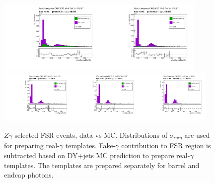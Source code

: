 \begin{figure}[htb]
  \begin{center}
   \includegraphics[width=0.45\textwidth]{../figs/figs_v11/MUON_ZGamma/PrepareYields/c_TotalDATAvsMC_EtaCommon__phoSigmaIEtaIEtaFSR_pt10to15_.pdf}\includegraphics[width=0.45\textwidth]{../figs/figs_v11/MUON_ZGamma/PrepareYields/c_TotalDATAvsMC_EtaCommon__phoSigmaIEtaIEtaFSR_pt15to20_.pdf}\\
\includegraphics[width=0.32\textwidth]{../figs/figs_v11/MUON_ZGamma/PrepareYields/c_TotalDATAvsMC_EtaCommon__phoSigmaIEtaIEtaFSR_pt20to25_.pdf}\includegraphics[width=0.32\textwidth]{../figs/figs_v11/MUON_ZGamma/PrepareYields/c_TotalDATAvsMC_EtaCommon__phoSigmaIEtaIEtaFSR_pt25to30_.pdf}\includegraphics[width=0.32\textwidth]{../figs/figs_v11/MUON_ZGamma/PrepareYields/c_TotalDATAvsMC_EtaCommon__phoSigmaIEtaIEtaFSR_pt30to500_.pdf}\\
  \caption{$Z\gamma$-selected FSR events, data vs MC. Distributions of $\sigma_{i\eta i \eta}$ are used for preparing real-$\gamma$ templates. Fake-$\gamma$ contribution to FSR region is subtracted based on DY+jets MC prediction to prepare real-$\gamma$ templates. The templates are prepared separately for barrel and endcap photons.}
  \label{fig:Zg_FSR_phoSigmaIEtaIEta}
  \end{center}
\end{figure}

